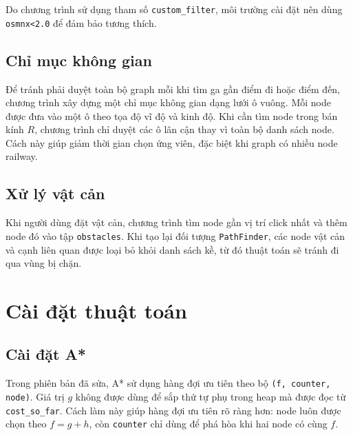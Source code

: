 \documentclass[12pt,a4paper]{article}
\begin{document}
Do chương trình sử dụng tham số \texttt{custom\_filter}, môi trường cài đặt nên dùng \texttt{osmnx<2.0} để đảm bảo tương thích.

\subsection{Chỉ mục không gian}

Để tránh phải duyệt toàn bộ graph mỗi khi tìm ga gần điểm đi hoặc điểm đến, chương trình xây dựng một chỉ mục không gian dạng lưới ô vuông. Mỗi node được đưa vào một ô theo tọa độ vĩ độ và kinh độ. Khi cần tìm node trong bán kính $R$, chương trình chỉ duyệt các ô lân cận thay vì toàn bộ danh sách node. Cách này giúp giảm thời gian chọn ứng viên, đặc biệt khi graph có nhiều node railway.

\subsection{Xử lý vật cản}

Khi người dùng đặt vật cản, chương trình tìm node gần vị trí click nhất và thêm node đó vào tập \texttt{obstacles}. Khi tạo lại đối tượng \texttt{PathFinder}, các node vật cản và cạnh liên quan được loại bỏ khỏi danh sách kề, từ đó thuật toán sẽ tránh đi qua vùng bị chặn.

\section{Cài đặt thuật toán}

\subsection{Cài đặt A*}

Trong phiên bản đã sửa, A* sử dụng hàng đợi ưu tiên theo bộ \texttt{(f, counter, node)}. Giá trị $g$ không được dùng để sắp thứ tự phụ trong heap mà được đọc từ \texttt{cost\_so\_far}. Cách làm này giúp hàng đợi ưu tiên rõ ràng hơn: node luôn được chọn theo $f=g+h$, còn \texttt{counter} chỉ dùng để phá hòa khi hai node có cùng $f$.
\end{document}
